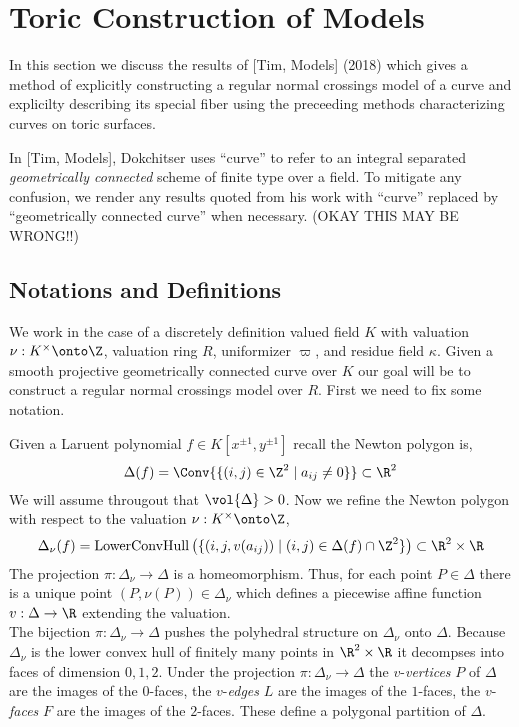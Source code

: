 
\section{Toric Construction of Models}

In this section we discuss the results of [Tim, Models] (2018) which gives a method of explicitly constructing a regular normal crossings model of a curve and explicilty describing its special fiber using the preceeding methods characterizing curves on toric surfaces. 
\begin{rmk}
In [Tim, Models], Dokchitser uses ``curve'' to refer to an integral separated \textit{geometrically connected} scheme of finite type over a field. To mitigate any confusion, we render any results quoted from his work with ``curve'' replaced by ``geometrically connected curve'' when necessary.
(OKAY THIS MAY BE WRONG!!)
\end{rmk}

\subsection{Notations and Definitions}

We work in the case of a discretely definition valued field $K$ with valuation $\nu : K^\times \onto \Z$, valuation ring $R$, uniformizer $\varpi$, and residue field $\kappa$. Given a smooth projective geometrically connected curve over $K$ our goal will be to construct a regular normal crossings model over $R$. First we need to fix some notation.

\begin{defn}
Given a Laruent polynomial $f \in K[x^{\pm 1}, y^{\pm 1}]$ recall the Newton polygon is,
\[ \Delta(f) = \Conv{ \{ (i,j) \in \Z^2 \mid a_{ij} \neq 0 \} } \subset \R^2 \]
We will assume througout that $\vol{\Delta} > 0$. 
Now we refine the Newton polygon with respect to the valuation $\nu : K^\times \onto \Z$,
\[ \Delta_\nu(f) = \mathrm{LowerConvHull} \left( \{ (i, j, v(a_{ij})) \mid (i, j) \in \Delta(f) \cap \Z^2 \} \right) \subset \R^2 \times \R \]
The projection $\pi : \Delta_\nu \to \Delta$ is a homeomorphism. Thus,
for each point $P \in \Delta$ there is a unique point $(P, \nu(P)) \in \Delta_\nu$ which defines a piecewise affine function $v : \Delta \to \R$ extending the valuation. 
\bigskip\\
The bijection $\pi : \Delta_\nu \to \Delta$ pushes the polyhedral structure on $\Delta_\nu$ onto $\Delta$. Because $\Delta_\nu$ is the lower convex hull of finitely many points in $\R^2 \times \R$ it decompses into faces of dimension $0, 1, 2$. Under the projection $\pi : \Delta_\nu \to \Delta$ the $v$-\textit{vertices} $P$ of $\Delta$ are the images of the $0$-faces, the $v$-\textit{edges} $L$ are the images of the $1$-faces, the $v$-\textit{faces} $F$ are the images of the $2$-faces. These define a polygonal partition of $\Delta$. 
\end{defn}


